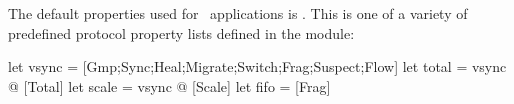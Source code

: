 The default properties used for \ensemble\ applications is .
This is one of a variety of predefined protocol property lists defined in the
 module:
\begin{codebox}
let vsync = [Gmp;Sync;Heal;Migrate;Switch;Frag;Suspect;Flow]
let total = vsync @ [Total]
let scale = vsync @ [Scale]
let fifo = [Frag]
\end{codebox}
